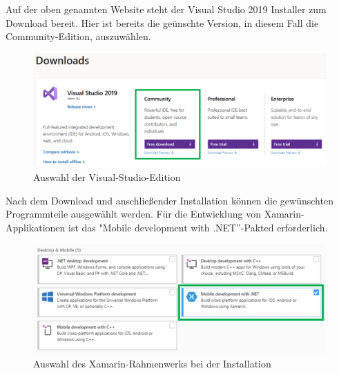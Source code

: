 

Auf der oben genannten Website steht der Visual Studio 2019 Installer zum Download bereit.
Hier ist bereits die geünschte Version, in diesem Fall die Community-Edition, auszuwählen.
\begin{figure}[H]
    \centering\includegraphics[width=0.9\linewidth]{images/auswahl_rahmenwerk/download.png}    
    \caption{Auswahl der Visual-Studio-Edition}
\end{figure}
Nach dem Download und anschließender Installation können die gewünschten Programmteile ausgewählt werden.
Für die Entwicklung von Xamarin-Applikationen ist das "Mobile development with .NET''-Pakted erforderlich.
\begin{figure}[H]
    \centering\includegraphics[width=0.9\linewidth]{images/auswahl_rahmenwerk/installation.png}    
    \caption{Auswahl des Xamarin-Rahmenwerks bei der Installation}
\end{figure}

